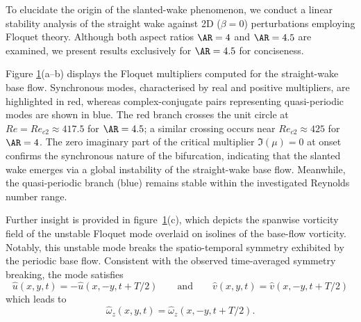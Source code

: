\begin{figure}
\label{fig:AR4p5_modes_Re430_beta0}
\end{figure}

To elucidate the origin of the slanted-wake phenomenon, we conduct a linear stability analysis of the straight wake against 2D ($\beta=0$) perturbations employing Floquet theory. Although both aspect ratios $\AR=4$ and $\AR=4.5$ are examined, we present results exclusively for $\AR=4.5$ for conciseness.

Figure \ref{fig:AR4p5_modes_Re430_beta0}(a--b) displays the Floquet multipliers computed for the straight-wake base flow. Synchronous modes, characterised by real and positive multipliers, are highlighted in red, whereas complex-conjugate pairs representing quasi-periodic modes are shown in blue.
%
The red branch crosses the unit circle at $Re=Re_{c2} \approx 417.5$ for $\AR=4.5$; a similar crossing occurs near $Re_{c2} \approx 425$ for $\AR=4$. The zero imaginary part of the critical multiplier $\Im(\mu) = 0$ at onset confirms the synchronous nature of the bifurcation, indicating that the slanted wake emerges via a global instability of the straight-wake base flow. Meanwhile, the quasi-periodic branch (blue) remains stable within the investigated Reynolds number range.

Further insight is provided in figure~\ref{fig:AR4p5_modes_Re430_beta0}(c), which depicts the spanwise vorticity field of the unstable Floquet mode overlaid on isolines of the base-flow vorticity. Notably, this unstable mode breaks the spatio-temporal symmetry exhibited by the periodic base flow. Consistent with the observed time-averaged symmetry breaking, the mode satisfies
%
\begin{equation}
  \hat{u}(x,y,t) = - \hat{u}(x,-y,t+T/2) \qquad \text{and} \qquad \hat{v}(x,y,t) = \hat{v}(x,-y,t+T/2)
\end{equation}
%
which leads to
%
\begin{equation}
  \hat{\omega}_z(x,y,t) = \hat{\omega}_z(x,-y,t+T/2).
\end{equation}

